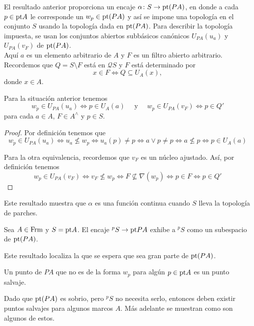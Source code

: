 El resultado anterior proporciona un encaje $\alpha\colon S\to \mathrm{pt} (PA)$, en donde a cada $p\in \mathrm{pt} A$ le corresponde un $w_p\in \mathrm{pt} (PA)$ y así se impone una topología en el conjunto $S$ usando la topología dada en $\mathrm{pt} (PA)$. Para describir la topología impuesta, se usan los conjuntos abiertos subbásicos canónicos $U_{PA}(u_a)$ y $U_{PA}(v_F)$ de $\mathrm{pt} (PA)$.\\

Aquí $a$ es un elemento arbitrario de $A$ y $F$ es un filtro abierto arbitrario. Recordemos que $Q=S\setminus F$ está en $\mathcal{Q}S$ y $F$ está determinado por 
\[
x\in F\Leftrightarrow Q\subseteq U_A(x), 
\]
donde $x\in A$.

\begin{lem}\label{Lema9.3.2}
    Para la situación anterior tenemos 
    \[
    w_p\in U_{PA}(u_a)\Leftrightarrow p\in U_A(a)\quad \mbox{ y }\quad w_p\in U_{PA}(v_F)\Leftrightarrow p \in Q'
    \]
    para cada $a\in A$, $F\in A^\wedge$ y $p\in S$.
\end{lem}

\begin{proof}
    Por definición tenemos que 
    \[
    w_p\in U_{PA}(u_a)\Leftrightarrow u_a\nleq w_p\Leftrightarrow u_a(p)\neq p\Leftrightarrow a\vee p\neq p\Leftrightarrow a\nleq p\Leftrightarrow p\in U_A(a)
    \]

    Para la otra equivalencia, recordemos que $v_F$ es un núcleo ajustado. Así, por definición tenemos
    \[
    w_p\in U_{PA}(v_F)\Leftrightarrow v_F\nleq w_p\Leftrightarrow F\nsubseteq \nabla (w_p)\Leftrightarrow p\in F\Leftrightarrow p\in Q'
    \]
\end{proof}

Este resultado muestra que $\alpha$ es una función continua cuando $S$ lleva la topología de parches.

\begin{thm}\label{Teorema9.3.3}
    Sea $A\in \mathrm{Frm}$ y $S=\mathrm{pt} A$. El encaje $^pS\to \mathrm{pt} PA$ exhibe a $^pS$ como un subespacio de $\mathrm{pt} (PA)$.
\end{thm}

Este resultado localiza la que se espera que sea gran parte de $\mathrm{pt} (PA)$.

\begin{dfn}\label{Definicion9.3.4}
    Un punto de $PA$ que no es de la forma $w_p$ para algún $p\in \mathrm{pt} A$ es un punto salvaje.
\end{dfn}

Dado que $\mathrm{pt}(PA)$ es sobrio, pero $^pS$ no necesita serlo, entonces deben existir puntos salvajes para algunos marcos $A$. Más adelante se muestran como son algunos de estos.\\

